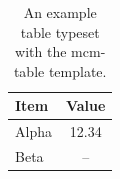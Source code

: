 \documentclass[12pt]{article}
\begin{document}
\begin{table}[htbp]
  \centering
  \caption{An example table typeset with the mcm-table template.}
  \begin{tabular}{l S[table-format=3.2]}
    \toprule
    Item  & {Value} \\
    \midrule
    Alpha & 12.34 \\
    Beta  & {--}  \\
    \bottomrule
  \end{tabular}
\end{table}
\end{document}
